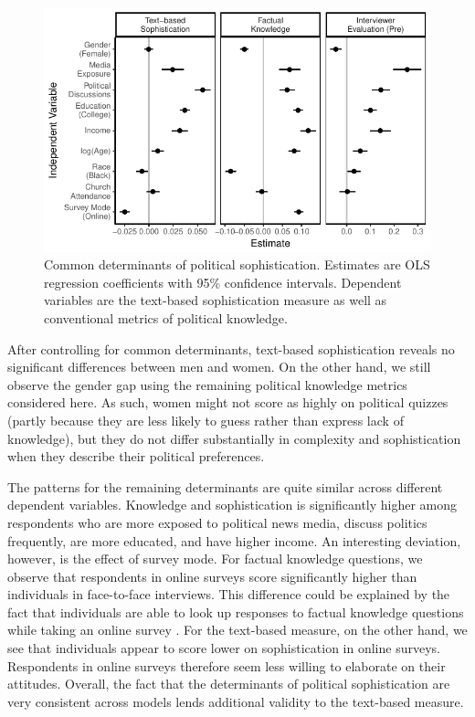 \documentclass[12pt]{article}
\begin{document}
\begin{figure}[h]\centering
\includegraphics{../fig/determinants_pres.pdf}
\caption{Common determinants of political sophistication. Estimates are OLS regression coefficients with 95\% confidence intervals. Dependent variables are the text-based sophistication measure as well as conventional metrics of political knowledge.
}\label{fig:determinants}
\end{figure}

After controlling for common determinants, text-based sophistication reveals no significant differences between men and women. On the other hand, we still observe the gender gap using the remaining political knowledge metrics considered here. As such, women might not score as highly on political quizzes (partly because they are less likely to guess rather than express lack of knowledge), but they do not differ substantially in complexity and sophistication when they describe their political preferences.

The patterns for the remaining determinants are quite similar across different dependent variables. Knowledge and sophistication is significantly higher among respondents who are more exposed to political news media, discuss politics frequently, are more educated, and have higher income. An interesting deviation, however, is the effect of survey mode. For factual knowledge questions, we observe that respondents in online surveys score significantly higher than individuals in face-to-face interviews. This difference could be explained by the fact that individuals are able to look up responses to factual knowledge questions while taking an online survey \citep[see also][]{clifford2016cheating}. For the text-based measure, on the other hand, we see that individuals appear to score lower on sophistication in online surveys. Respondents in online surveys therefore seem less willing to elaborate on their attitudes. Overall, the fact that the determinants of political sophistication are very consistent across models lends additional validity to the text-based measure.
\end{document}
